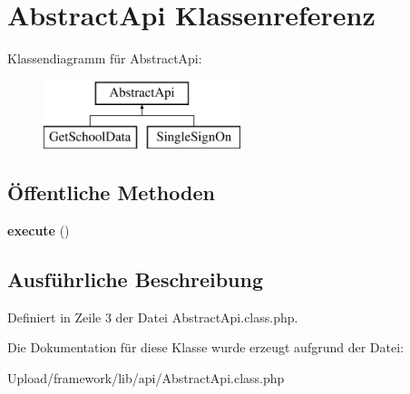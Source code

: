\hypertarget{class_abstract_api}{}\section{Abstract\+Api Klassenreferenz}
\label{class_abstract_api}
Klassendiagramm für Abstract\+Api\+:\begin{figure}[H]
\begin{center}
\leavevmode
\includegraphics[height=2.000000cm]{class_abstract_api}
\end{center}
\end{figure}
\subsection*{Öffentliche Methoden}
\begin{DoxyCompactItemize}
\item 
\mbox{\label{class_abstract_api_a41318d40d248e969d50e45fd5968cc1c}} 
{\bfseries execute} ()
\end{DoxyCompactItemize}


\subsection{Ausführliche Beschreibung}


Definiert in Zeile 3 der Datei Abstract\+Api.\+class.\+php.



Die Dokumentation für diese Klasse wurde erzeugt aufgrund der Datei\+:\begin{DoxyCompactItemize}
\item 
Upload/framework/lib/api/Abstract\+Api.\+class.\+php\end{DoxyCompactItemize}
